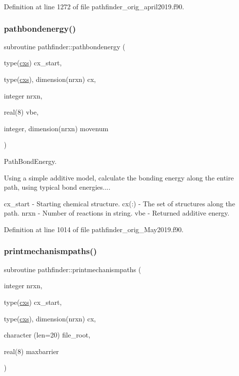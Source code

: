 Definition at line 1272 of file pathfinder\+\_\+orig\+\_\+april2019.\+f90.

\mbox{\label{namespacepathfinder_a87bea3e752b4f8db790f97d64d2c6b9a}} 
\subsubsection{\texorpdfstring{pathbondenergy()}{pathbondenergy()}\hspace{0.1cm}{\footnotesize\ttfamily [3/3]}}
{\footnotesize\ttfamily subroutine pathfinder\+::pathbondenergy (\begin{DoxyParamCaption}\item[{type(\mbox{\hyperlink{structchemstr_1_1cxs}{cxs}})}]{cx\+\_\+start,  }\item[{type(\mbox{\hyperlink{structchemstr_1_1cxs}{cxs}}), dimension(nrxn)}]{cx,  }\item[{integer}]{nrxn,  }\item[{real(8)}]{vbe,  }\item[{integer, dimension(nrxn)}]{movenum }\end{DoxyParamCaption})}



Path\+Bond\+Energy. 

Using a simple additive model, calculate the bonding energy along the entire path, using typical bond energies....

cx\+\_\+start -\/ Starting chemical structure. cx(\+:) -\/ The set of structures along the path. nrxn -\/ Number of reactions in string. vbe -\/ Returned additive energy. 

Definition at line 1014 of file pathfinder\+\_\+orig\+\_\+\+May2019.\+f90.

\mbox{\label{namespacepathfinder_ab000582f6e17d2ac76cb52e246a70307}} 
\subsubsection{\texorpdfstring{printmechanismpaths()}{printmechanismpaths()}\hspace{0.1cm}{\footnotesize\ttfamily [3/3]}}
{\footnotesize\ttfamily subroutine pathfinder\+::printmechanismpaths (\begin{DoxyParamCaption}\item[{integer}]{nrxn,  }\item[{type(\mbox{\hyperlink{structchemstr_1_1cxs}{cxs}})}]{cx\+\_\+start,  }\item[{type(\mbox{\hyperlink{structchemstr_1_1cxs}{cxs}}), dimension(nrxn)}]{cx,  }\item[{character (len=20)}]{file\+\_\+root,  }\item[{real(8)}]{maxbarrier }\end{DoxyParamCaption})}




